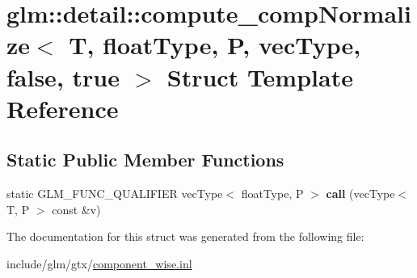 \hypertarget{structglm_1_1detail_1_1compute__compNormalize_3_01T_00_01floatType_00_01P_00_01vecType_00_01false_00_01true_01_4}{}\section{glm\+:\+:detail\+:\+:compute\+\_\+comp\+Normalize$<$ T, float\+Type, P, vec\+Type, false, true $>$ Struct Template Reference}
\label{structglm_1_1detail_1_1compute__compNormalize_3_01T_00_01floatType_00_01P_00_01vecType_00_01false_00_01true_01_4}
\subsection*{Static Public Member Functions}
\begin{DoxyCompactItemize}
\item 
\mbox{\label{structglm_1_1detail_1_1compute__compNormalize_3_01T_00_01floatType_00_01P_00_01vecType_00_01false_00_01true_01_4_a235bbd9a5c21afab67a9f61705a3fcc5}} 
static G\+L\+M\+\_\+\+F\+U\+N\+C\+\_\+\+Q\+U\+A\+L\+I\+F\+I\+ER vec\+Type$<$ float\+Type, P $>$ {\bfseries call} (vec\+Type$<$ T, P $>$ const \&v)
\end{DoxyCompactItemize}


The documentation for this struct was generated from the following file\+:\begin{DoxyCompactItemize}
\item 
include/glm/gtx/\hyperlink{component__wise_8inl}{component\+\_\+wise.\+inl}\end{DoxyCompactItemize}
